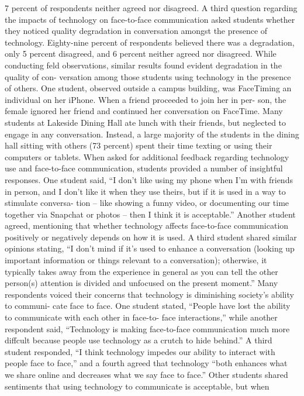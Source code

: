 \documentclass[11pt]{article} %
\begin{document}
7 percent of respondents neither agreed nor disagreed. 
A third question regarding the impacts of technology on face-to-face communication asked students 
whether they noticed quality degradation in conversation amongst the presence of technology. Eighty-nine 
percent of respondents believed there was a degradation, only 5 percent disagreed, and 6 percent neither agreed nor 
disagreed. 
While conducting feld observations, similar results found evident degradation in the quality of con-
versation among those students using technology in the presence of others. One student, observed outside a 
campus building, was FaceTiming an individual on her iPhone. When a friend proceeded to join her in per-
son, the female ignored her friend and continued her conversation on FaceTime. Many students at Lakeside 
Dining Hall ate lunch with their friends, but neglected to engage in any conversation. Instead, a large majority 
of the students in the dining hall sitting with others (73 percent) spent their time texting or using their computers or 
tablets. 
When asked for additional feedback regarding technology use and face-to-face communication, 
students provided a number of insightful responses. One student said, “I don’t like using my phone when I’m 
with friends in person, and I don’t like it when they use theirs, but if it is used in a way to stimulate conversa-
tion – like showing a funny video, or documenting our time together via Snapchat or photos – then I think it is 
acceptable.” Another student agreed, mentioning that whether technology affects face-to-face communication 
positively or negatively depends on how it is used. A third student shared similar opinions stating, “I don’t mind 
if it’s used to enhance a conversation (looking up important information or things relevant to a conversation); 
otherwise, it typically takes away from the experience in general as you can tell the other person(s) attention 
is divided and unfocused on the present moment.” 
Many respondents voiced their concerns that technology is diminishing society’s ability to communi-
cate face to face. One student stated, “People have lost the ability to communicate with each other in face-to-
face interactions,” while another respondent said, “Technology is making face-to-face communication much 
more diffcult because people use technology as a crutch to hide behind.” A third student responded, “I think 
technology impedes our ability to interact with people face to face,” and a fourth agreed that technology “both 
enhances what we share online and decreases what we say face to face.”
Other students shared sentiments that using technology to communicate is acceptable, but when 
\end{document}
